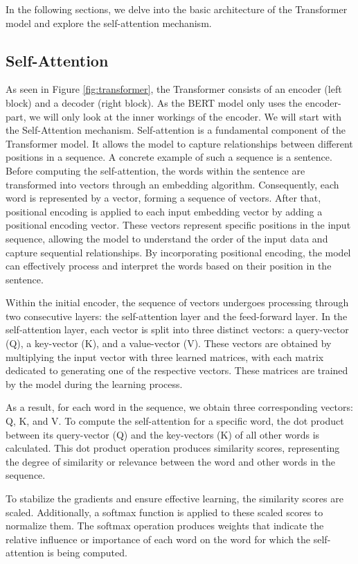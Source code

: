 \documentclass[a4paper,10pt]{report}
\begin{document}
In the following sections, we delve into the basic architecture of the Transformer model and explore the self-attention mechanism.

\subsection{Self-Attention}
As seen in Figure \ref{fig:transformer}, the Transformer consists of an encoder (left block) and a decoder (right block). As the BERT model only uses the encoder-part, we will only look at the inner workings of the encoder. We will start with the Self-Attention mechanism.
Self-attention is a fundamental component of the Transformer model. It allows the model to capture relationships between different positions in a sequence. A concrete example of such a sequence is a sentence. Before computing the self-attention, the words within the sentence are transformed into vectors through an embedding algorithm. Consequently, each word is represented by a vector, forming a sequence of vectors. After that, positional encoding is applied to each input embedding vector by adding a positional encoding vector. These vectors represent specific positions in the input sequence, allowing the model to understand the order of the input data and capture sequential relationships. By incorporating positional encoding, the model can effectively process and interpret the words based on their position in the sentence.

Within the initial encoder, the sequence of vectors undergoes processing through two consecutive layers: the self-attention layer and the feed-forward layer. In the self-attention layer, each vector is split into three distinct vectors: a query-vector (Q), a key-vector (K), and a value-vector (V). These vectors are obtained by multiplying the input vector with three learned matrices, with each matrix dedicated to generating one of the respective vectors. These matrices are trained by the model during the learning process.

As a result, for each word in the sequence, we obtain three corresponding vectors: Q, K, and V. To compute the self-attention for a specific word, the dot product between its query-vector (Q) and the key-vectors (K) of all other words is calculated. This dot product operation produces similarity scores, representing the degree of similarity or relevance between the word and other words in the sequence.

To stabilize the gradients and ensure effective learning, the similarity scores are scaled. Additionally, a softmax function is applied to these scaled scores to normalize them. The softmax operation produces weights that indicate the relative influence or importance of each word on the word for which the self-attention is being computed.
\end{document}
